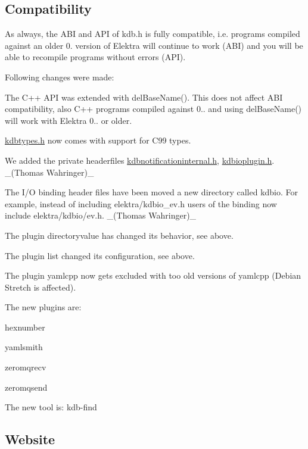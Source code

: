 \subsection*{Compatibility}

As always, the A\+BI and A\+PI of kdb.\+h is fully compatible, i.\+e. programs compiled against an older 0. version of Elektra will continue to work (A\+BI) and you will be able to recompile programs without errors (A\+PI).

Following changes were made\+:


\begin{DoxyItemize}
\item The C++ A\+PI was extended with {\ttfamily del\+Base\+Name()}. This does not affect A\+BI compatibility, also C++ programs compiled against 0.. and using {\ttfamily del\+Base\+Name()} will work with Elektra 0.. or older.
\item {\ttfamily \hyperlink{kdbtypes_8h}{kdbtypes.\+h}} now comes with support for C99 types.
\item We added the private headerfiles {\ttfamily \hyperlink{kdbnotificationinternal_8h}{kdbnotificationinternal.\+h}}, {\ttfamily \hyperlink{kdbioplugin_8h}{kdbioplugin.\+h}}. \+\_\+(\+Thomas Wahringer)\+\_\+
\item The I/O binding header files have been moved a new directory called {\ttfamily kdbio}. For example, instead of including {\ttfamily elektra/kdbio\+\_\+ev.\+h} users of the binding now include {\ttfamily elektra/kdbio/ev.\+h}. \+\_\+(\+Thomas Wahringer)\+\_\+
\item The plugin directoryvalue has changed its behavior, see above.
\item The plugin list changed its configuration, see above.
\item The plugin yamlcpp now gets excluded with too old versions of yamlcpp (Debian Stretch is affected).
\end{DoxyItemize}

The new plugins are\+:


\begin{DoxyItemize}
\item hexnumber
\item yamlsmith
\item zeromqrecv
\item zeromqsend
\end{DoxyItemize}

The new tool is\+: kdb-\/find

\subsection*{Website}

